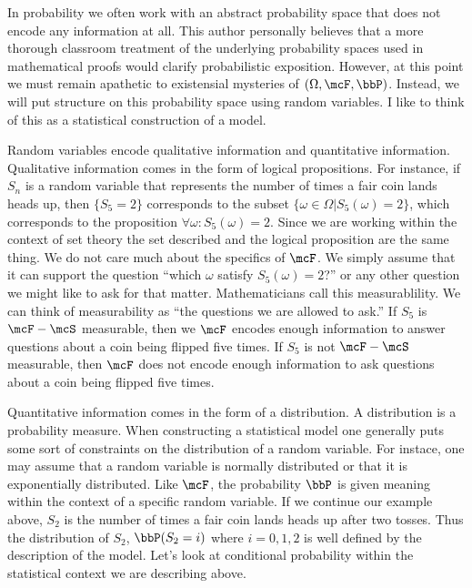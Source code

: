 \documentclass{report}
\begin{document}
In probability we often work with an abstract probability space that does not encode any information at all.  This author personally believes that a more thorough classroom treatment of the underlying probability spaces used in mathematical proofs would clarify probabilistic exposition.  However, at this point we must remain apathetic to existensial mysteries of $(\Omega, \mcF, \bbP)$.  Instead, we will put structure on this probability space using random variables.  I like to think of this as a statistical construction of a model.  

Random variables encode qualitative information and quantitative information.  Qualitative information comes in the form of logical propositions.  For instance, if $S_n$ is a random variable that represents the number of times a fair coin lands heads up, then $\{S_5 = 2\}$ corresponds to the subset $\{\omega \in \Omega | S_5(\omega) = 2\}$, which corresponds to the proposition $\forall \omega : S_5(\omega) = 2$.  Since we are working within the context of set theory the set described and the logical proposition are the same thing.  We do not care much about the specifics of $\mcF$.  We simply assume that it can support the question ``which $\omega$ satisfy $S_5(\omega) = 2$?'' or any other question we might like to ask for that matter.  Mathematicians call this measurablility.  We can think of measurability as ``the questions we are allowed to ask.''  If $S_5$ is $\mcF-\mcS$ measurable, then we $\mcF$ encodes enough information to answer questions about a coin being flipped five times.  If $S_5$ is not $\mcF-\mcS$ measurable, then $\mcF$ does not encode enough information to ask questions about a coin being flipped five times.

Quantitative information comes in the form of a distribution.  A distribution is a probability measure.  When constructing a statistical model one generally puts some sort of constraints on the distribution of a random variable.  For instace, one may assume that a random variable is normally distributed or that it is exponentially distributed.  Like $\mcF$, the probability $\bbP$ is given meaning within the context of a specific random variable.  If we continue our example above, $S_2$ is the number of times a fair coin lands heads up after two tosses.  Thus the distribution of $S_2$, $\bbP(S_2 = i)$ where $i=0,1,2$ is well defined by the description of the model.  Let's look at conditional probability within the statistical context we are describing above.
\end{document}
